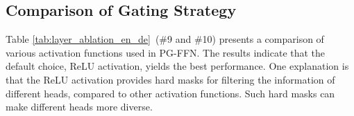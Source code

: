 \documentclass[11pt]{article}
\begin{document}
\begin{table}[t!]
    \centering
    \renewcommand{\arraystretch}{1}
\centering
\small
\setlength{\tabcolsep}{2pt}

    \caption{Ablation studies on WMT'14 En-De task.}
    \label{tab:layer_ablation_en_de}
\end{table}






\subsection{Comparison of Gating Strategy}

Table \ref{tab:layer_ablation_en_de}~(\#9 and \#10) presents a comparison of various activation functions used in PG-FFN. The results indicate that the default choice, ReLU activation, yields the best performance. 
One explanation is that the ReLU activation provides hard masks for filtering the information of different heads, compared to other activation functions. Such hard masks can make different heads more diverse.
\end{document}
